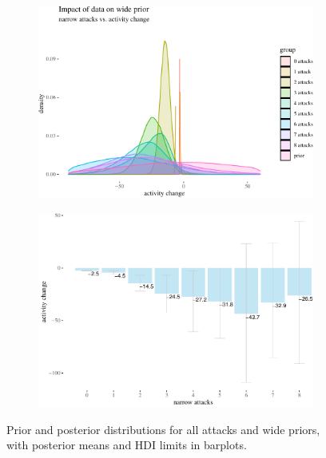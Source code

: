 \documentclass[10pt,]{scrartcl}
\begin{document}
\scriptsize

\newpage

\begin{figure}[!ht]
\begin{subfigure}[!ht]{0.9\textwidth}

\begin{center}\includegraphics[width=1\linewidth]{redditAnalysisWalkthrough_files/figure-latex/unnamed-chunk-54-1} \end{center}
\end{subfigure} 


\begin{subfigure}[!ht]{0.9\textwidth}

\begin{center}\includegraphics[width=1\linewidth]{redditAnalysisWalkthrough_files/figure-latex/unnamed-chunk-55-1} \end{center}
\end{subfigure}


\caption{Prior and posterior distributions for all attacks and wide priors, with posterior means and HDI limits in barplots.}
\label{fig:bayesian1}
\end{figure}
\end{document}
